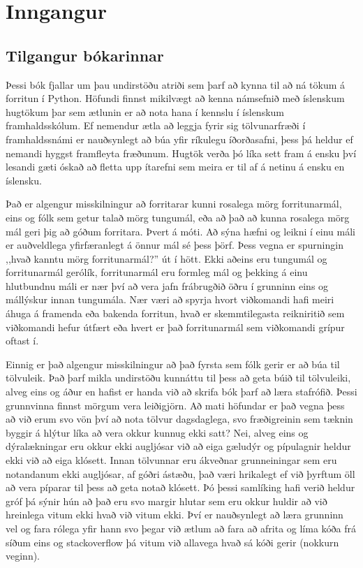 
\chapter{Inngangur}

\section{Tilgangur bókarinnar}

Þessi bók fjallar um þau undirstöðu atriði sem þarf að kynna til að ná tökum á forritun í Python. 
Höfundi finnst mikilvægt að kenna námsefnið með íslenskum hugtökum þar sem ætlunin er að nota hana í kennslu í íslenskum framhaldsskólum. 
Ef nemendur ætla að leggja fyrir sig tölvunarfræði í framhaldssnámi er nauðsynlegt að búa yfir ríkulegu íðorðasafni, þess þá heldur ef nemandi hyggst framfleyta fræðunum. 
Hugtök verða þó líka sett fram á ensku því lesandi gæti óskað að fletta upp ítarefni sem meira er til af á netinu á ensku en íslensku.

Það er algengur misskilningur að forritarar kunni rosalega mörg forritunarmál, eins og fólk sem getur talað mörg tungumál, eða að það að kunna rosalega mörg mál geri þig að góðum forritara.
Þvert á móti.
Að sýna hæfni og leikni í einu máli er auðveldlega yfirfæranlegt á önnur mál sé þess þörf.
Þess vegna er spurningin ,,hvað kanntu mörg forritunarmál?'' út í hött.
Ekki aðeins eru tungumál og forritunarmál gerólík, forritunarmál eru formleg mál og þekking á einu hlutbundnu máli er nær því að vera jafn frábrugðið öðru í grunninn eins og mállýskur innan tungumála.
Nær væri að spyrja hvort viðkomandi hafi meiri áhuga á framenda eða bakenda forritun, hvað er skemmtilegasta reikniritið sem viðkomandi hefur útfært eða hvert er það forritunarmál sem viðkomandi grípur oftast í.

Einnig er það algengur misskilningur að það fyrsta sem fólk gerir er að búa til tölvuleik.
Það þarf mikla undirstöðu kunnáttu til þess að geta búið til tölvuleiki, alveg eins og áður en hafist er handa við að skrifa bók þarf að læra stafrófið.
Þessi grunnvinna finnst mörgum vera leiðigjörn.
Að mati höfundar er það vegna þess að við erum svo vön því að nota tölvur dagsdaglega, svo fræðigreinin sem tæknin byggir á hlýtur líka að vera okkur kunnug ekki satt?
Nei, alveg eins og dýralækningar eru okkur ekki augljósar við að eiga gæludýr og pípulagnir heldur ekki við að eiga klósett.
Innan tölvunnar eru ákveðnar grunneiningar sem eru notandanum ekki augljósar, af góðri ástæðu, það væri hrikalegt ef við þyrftum öll að vera píparar til þess að geta notað klósett.
Þó þessi samlíking hafi verið heldur gróf þá sýnir hún að það eru svo margir hlutar sem eru okkur huldir að við hreinlega vitum ekki hvað við vitum ekki.
Því er nauðsynlegt að læra grunninn vel og fara rólega yfir hann svo þegar við ætlum að fara að afrita og líma kóða frá síðum eins og stackoverflow þá vitum við allavega hvað sá kóði gerir (nokkurn veginn).

